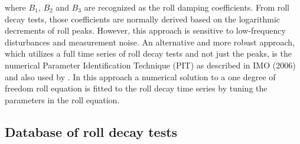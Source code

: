 




where $B_1$, $B_2$ and $B_3$ are recognized as the roll damping coefficients.
From roll decay tests, those coefficients are normally derived based on the logarithmic decrements of roll peaks. However, this approach is sensitive to low-frequency disturbances and measurement noise. An alternative and more robust approach, which utilizes a full time series of roll decay tests and not just the peaks, is the numerical Parameter Identification Technique (PIT) as described in IMO (2006) and also used by \parencite{bulian_simplified_2004}. In this approach a numerical solution to a one degree of freedom roll equation is fitted to the roll decay time series by tuning the parameters in the roll equation.



\subsection{Database of roll decay tests}
\label{se:database_of_roll_decay_tests}




